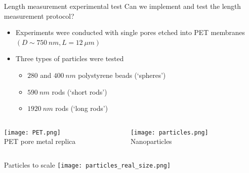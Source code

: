 \begin{frame}[c]{Length measurement experimental test}
	\textcolor{negativered}{Can we implement and test the length measurement protocol?} \\
	\begin{itemize}
		\item Experiments were conducted with single pores etched into PET membranes $\left(D\sim\SI{750}{nm}, L=\SI{12}{\mu m}\right)$
		\item Three types of particles were tested
		\begin{itemize}
			\item $280$ and $\SI{400}{nm}$ polystyrene beads  (`spheres')
			\item $\SI{590}{nm}$ rods (`short rods')
			\item $\SI{1920}{nm}$ rods (`long rods')
		\end{itemize}
	\end{itemize}
	
	\begin{columns}[t]
		\begin{column}[T]{2.25in}
			{\centering
				\texttt{[image: PET.png]} \\
				PET pore metal replica \\
				\par
			}
		\end{column}
		
		\begin{column}[T]{2.25in}
			{\centering
				\texttt{[image: particles.png]} \\
				Nanoparticles \\
				\par				
			}
		\end{column}

	\end{columns}



\end{frame}



\begin{frame}[c]{Particles to scale}
	\texttt{[image: particles\_real\_size.png]}
\end{frame}



